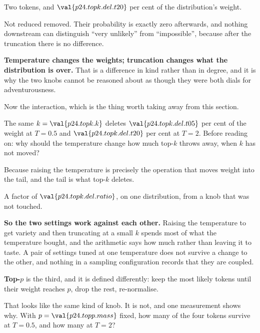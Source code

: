 \begin{fr}
\begin{ansblock}
Two tokens, and $\val{p24.topk.del.t20}$ per cent of the distribution's
weight.
\end{ansblock}

Not reduced \dash{} removed. Their probability is exactly zero afterwards, and
nothing downstream can distinguish \enquote{very unlikely} from
\enquote{impossible}, because after the truncation there is no difference.

\textbf{Temperature changes the weights; truncation changes what the
distribution is over.} That is a difference in kind rather than in degree, and
it is why the two knobs cannot be reasoned about as though they were both
dials for adventurousness.
\end{fr}

\begin{fr}
Now the interaction, which is the thing worth taking away from this section.

The same $k = \val{p24.topk.k}$ deletes
$\val{p24.topk.del.t05}$ per cent of the weight at $T = \num{0.5}$ and
$\val{p24.topk.del.t20}$ per cent at $T = 2$. Before reading on: why should
the temperature change how much top-$k$ throws away, when $k$ has not moved?
\dotline
\nextframe
\end{fr}

\begin{fr}
\begin{ansblock}
Because raising the temperature is precisely the operation that moves weight
into the tail, and the tail is what top-$k$ deletes.
\end{ansblock}

A factor of $\val{p24.topk.del.ratio}$, on one distribution, from a knob that
was not touched.

\textbf{So the two settings work against each other.} Raising the temperature
to get variety and then truncating at a small $k$ spends most of what the
temperature bought, and the arithmetic says how much rather than leaving it to
taste. A pair of settings tuned at one temperature does not survive a change
to the other, and nothing in a sampling configuration records that they are
coupled.
\end{fr}

\begin{fr}
\textbf{Top-$p$} is the third, and it is defined differently: keep the most
likely tokens until their weight reaches $p$, drop the rest, re-normalise.

That looks like the same kind of knob. It is not, and one measurement shows
why. With $p = \val{p24.topp.mass}$ fixed, how many of the four tokens survive
at $T = \num{0.5}$, and how many at $T = 2$?
\dotline
\nextframe
\end{fr}


